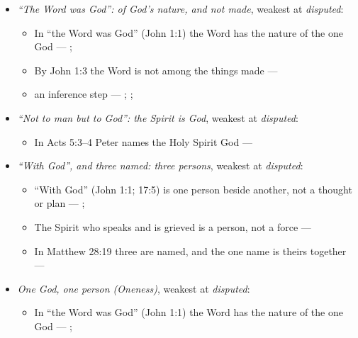 \documentclass[11pt,paper=\testimonypaper,DIV=13,parskip=false]{scrartcl}
\begin{document}
\begin{itemize}
\item \emph{“The Word was God”: of God’s nature, and not made}, weakest at \emph{disputed}:
\begin{itemize}
\item In “the Word was God” (John 1:1) the Word has the nature of the one God --- \cite{harner-qualitative-anarthrous-1973}; \cite[3, The Triune God]{kibbey-living-systematic-theology-2026}
\item By John 1:3 the Word is not among the things made --- \cite[Tractates on John I.11]{schaff-nicene-post-nicene-fathers-1-7}
\item an inference step --- \cite[3, The Triune God]{kibbey-living-systematic-theology-2026}; \cite[ch. 4, Conclusion]{bernard-oneness-of-god-1983}; \cite[17--19]{buzzard-caveat-lector-2001}
\end{itemize}
\item \emph{“Not to man but to God”: the Spirit is God}, weakest at \emph{disputed}:
\begin{itemize}
\item In Acts 5:3–4 Peter names the Holy Spirit God --- \cite[198]{calvin-commentary-acts-1844}
\end{itemize}
\item \emph{“With God”, and three named: three persons}, weakest at \emph{disputed}:
\begin{itemize}
\item “With God” (John 1:1; 17:5) is one person beside another, not a thought or plan --- \cite[3, The Triune God]{kibbey-living-systematic-theology-2026}; \cite[27]{watchtower-should-you-believe-trinity-1989}
\item The Spirit who speaks and is grieved is a person, not a force --- \cite[3, The Triune God]{kibbey-living-systematic-theology-2026}
\item In Matthew 28:19 three are named, and the one name is theirs together --- \cite[3, The Triune God]{kibbey-living-systematic-theology-2026}
\end{itemize}
\item \emph{One God, one person (Oneness)}, weakest at \emph{disputed}:
\begin{itemize}
\item In “the Word was God” (John 1:1) the Word has the nature of the one God --- \cite{harner-qualitative-anarthrous-1973}; \cite[3, The Triune God]{kibbey-living-systematic-theology-2026}

\end{itemize}
\end{itemize}
\end{document}
